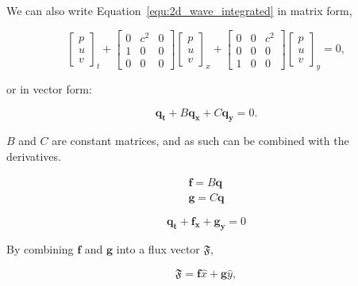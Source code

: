 We can also write Equation~\ref{equ:2d_wave_integrated} in matrix form,

\begin{equation} \label{equ:2d_wave_matrix}
	\begin{bmatrix}
        p \\ 
        u \\ 
        v
	\end{bmatrix}_t +
	\begin{bmatrix}
        0 & c^2 & 0 \\ 
        1 & 0 & 0 \\ 
        0 & 0 & 0
	\end{bmatrix}
	\begin{bmatrix}
        p\\ 
        u\\ 
        v
	\end{bmatrix}_x + 
	\begin{bmatrix}
        0 & 0 & c^2 \\ 
        0 & 0 & 0 \\ 
        1 & 0 & 0
	\end{bmatrix}
	\begin{bmatrix}
        p\\ 
        u\\ 
        v
	\end{bmatrix}_y = 0,
\end{equation}

\noindent
or in vector form:

\begin{equation} \label{equ:2d_wave_vector}
	\mathbf{q_t} + B \mathbf{q_x} + C \mathbf{q_y} = 0.
\end{equation}

$B$ and $C$ are constant matrices, and as such can be combined with the derivatives.

\begin{gather}
	\mathbf{f} = B \mathbf{q} \\
	\mathbf{g} = C \mathbf{q}
\end{gather}

\begin{equation}
	\mathbf{q_t} + \mathbf{f_x} + \mathbf{g_y} = 0
\end{equation}

By combining $\mathbf{f}$ and $\mathbf{g}$ into a flux vector $\mathfrak{F}$, 

\begin{equation} \label{equ:2d_wave_fluxes}
	\mathfrak{F} = \mathbf{f}\widehat{x} + \mathbf{g}\widehat{y},
\end{equation}

